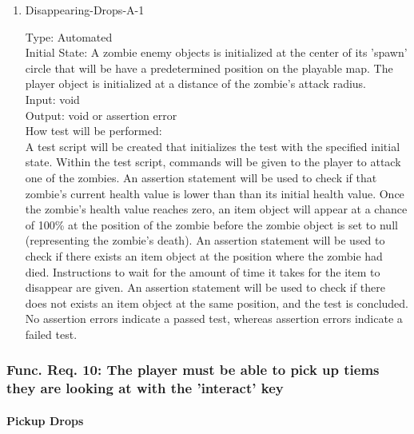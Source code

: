 \documentclass[12pt, titlepage]{article}
\begin{document}
\begin{enumerate}

\item{Disappearing-Drops-A-1\\}

Type: Automated\\
					
Initial State: A zombie enemy objects is initialized at the center of its 'spawn' circle that will be have a predetermined position on the playable map. The player object is initialized at a distance of the zombie's attack radius.\\
					
Input: void \\
					
Output: void or assertion error \\
					
How test will be performed:\\ A test script will be created that initializes the test with the specified initial state. Within the test script, commands will be given to the player to attack one of the zombies. An assertion statement will be used to check if that zombie's current health value is lower than than its initial health value. Once the zombie's health value reaches zero, an item object will appear at a chance of 100\% at the position of the zombie before the zombie object is set to null (representing the zombie's death). An assertion statement will be used to check if there exists an item object at the position where the zombie had died. Instructions to wait for the amount of time it takes for the item to disappear are given. An assertion statement will be used to check if there does not exists an item object at the same position, and the test is concluded. No assertion errors indicate a passed test, whereas assertion errors indicate a failed test.\\

\end{enumerate}

\subsubsection{Func. Req. 10: The player must be able to pick up tiems they are looking at with the 'interact' key}

\paragraph{Pickup Drops}
\end{document}
